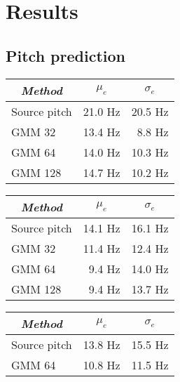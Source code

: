 \chapter{Results} %
\label{cha:results}

\section{Pitch prediction} %
\label{sec:pitch_prediction}

\begin{table}[ht]
	\begin{center}
		\begin{tabular}{lrr}
			\toprule
			\multicolumn{1}{c}{\emph{Method}} & \multicolumn{1}{c}{$\mu_e$} & \multicolumn{1}{c}{$\sigma_e$}\\
			\midrule
			Source pitch & 21.0 Hz & 20.5 Hz\\
			GMM 32 & 13.4 Hz & 8.8 Hz\\
			GMM 64 & 14.0 Hz & 10.3 Hz\\
			GMM 128 & 14.7 Hz &  10.2 Hz\\
			\bottomrule			
		\end{tabular}		
	\end{center}
\label{tab:pitch_prediction_baseline}	
\end{table}

\begin{table}[ht]
	\begin{center}
		\begin{tabular}{lrr}
			\toprule
			\multicolumn{1}{c}{\emph{Method}} & \multicolumn{1}{c}{$\mu_e$} & \multicolumn{1}{c}{$\sigma_e$}\\
			\midrule
			Source pitch & 14.1 Hz & 16.1 Hz\\
			GMM 32 & 11.4 Hz  & 12.4 Hz\\
			GMM 64 & 9.4 Hz  & 14.0 Hz\\
			GMM 128 & 9.4 Hz & 13.7 Hz\\
			\bottomrule			
		\end{tabular}		
	\end{center}
\label{tab:pitch_prediction_transformed}	
\end{table}

\begin{table}[ht]
	\begin{center}
		\begin{tabular}{lrr}
			\toprule
			\multicolumn{1}{c}{\emph{Method}} & \multicolumn{1}{c}{$\mu_e$} & \multicolumn{1}{c}{$\sigma_e$}\\
			\midrule
			Source pitch & 13.8 Hz & 15.5 Hz\\
			GMM 64 & 10.8 Hz & 11.5 Hz \\
			\bottomrule			
		\end{tabular}		
	\end{center}
\label{tab:pitch_prediction_unvoiced}	
\end{table}

